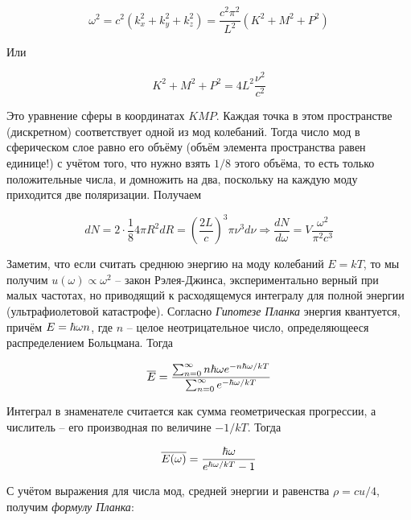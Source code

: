 \begin{equation*}
    \omega^2 = c^2 \left( k_x^2 + k_y^2 + k_z^2 \right) = \frac{c^2 \pi^2}{L^2} \left( K^2 + M^2 + P^2 \right)
\end{equation*}

\noindent
Или

\begin{equation}
    K^2 + M^2 + P^2 = 4 L^2 \frac{\nu^2}{c^2}
\end{equation}

\noindent
Это уравнение сферы в координатах $K M P$. Каждая точка в этом пространстве (дискретном) соответствует одной из мод колебаний. Тогда число мод в сферическом слое равно его объёму (объём элемента пространства равен единице!) с учётом того, что нужно взять $1 / 8$ этого объёма, то есть только положительные числа, и домножить на два, поскольку на каждую моду приходится две поляризации. Получаем

\begin{equation}
    d N = 2 \cdot \frac{1}{8} 4 \pi R^2 dR = \left( \frac{2 L}{c} \right)^3 \pi \nu^3 d \nu \Rightarrow \frac{d N}{d \omega} = V \frac{\omega^2}{\pi^2 c^3}
\end{equation}

\noindent
Заметим, что если считать среднюю энергию на моду колебаний $E = k T$, то мы получим $u(\omega) \propto \omega^2$ -- закон Рэлея-Джинса, экспериментально верный при малых частотах, но приводящий к расходящемуся интегралу для полной энергии (ультрафиолетовой катастрофе). Согласно \textit{Гипотезе Планка} энергия квантуется, причём $E = \hbar \omega n$, где $n$ -- целое неотрицательное число, определяющееся распределением Больцмана. Тогда

\begin{equation}
    \overline{E} = \frac{\sum_{n = 0}^\infty n \hbar \omega e^{- n \hbar \omega / k T}}{\sum_{n = 0}^\infty e^{- \hbar \omega / k T}}
\end{equation}

\noindent
Интеграл в знаменателе считается как сумма геометрическая прогрессии, а числитель -- его производная по величине $- 1 / k T$. Тогда

\begin{equation}
    \overline{E ( \omega)} = \frac{\hbar \omega}{e^{\hbar \omega / k T} - 1}
\end{equation}

\noindent
С учётом выражения для числа мод, средней энергии и равенства $\rho = c u / 4$, получим \textit{формулу Планка}:


